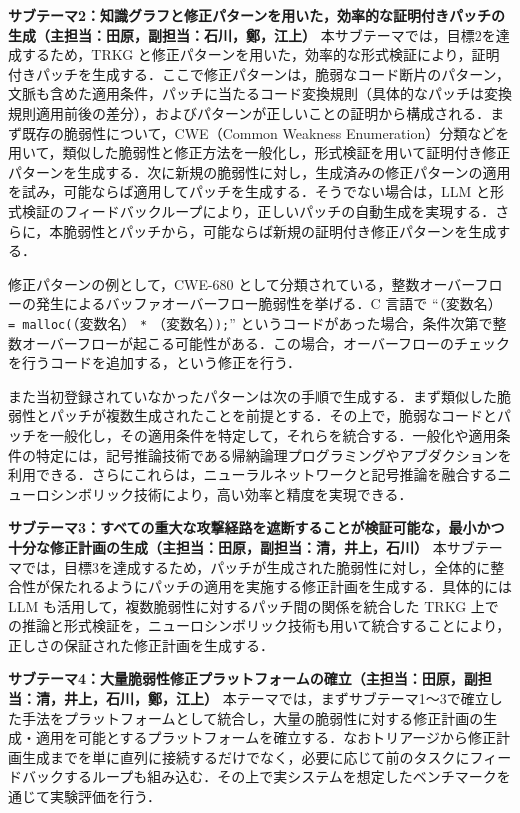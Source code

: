 \documentclass[11pt,a4j,dvipdfmx]{jarticle} 					%
\newcommand{\研究課題名}{大量の脆弱性・攻撃手段・パッチの依存関係を考慮した証明付き修正計画の自動生成}
\newcommand{\研究機関名}{電気通信大学}
\newcommand{\研究代表者氏名}{田原 康之}
\newcommand{\研究期間の最終元号年度}{12}  %
\begin{document}
\noindent\textbf{サブテーマ2：知識グラフと修正パターンを用いた，効率的な証明付きパッチの生成（主担当：田原，副担当：石川，鄭，江上）} 本サブテーマでは，目標2を達成するため，TRKG と修正パターンを用いた，効率的な形式検証により，証明付きパッチを生成する．ここで修正パターンは，脆弱なコード断片のパターン，文脈も含めた適用条件，パッチに当たるコード変換規則（具体的なパッチは変換規則適用前後の差分），およびパターンが正しいことの証明から構成される．まず既存の脆弱性について，CWE（Common Weakness Enumeration）分類などを用いて，類似した脆弱性と修正方法を一般化し，形式検証を用いて証明付き修正パターンを生成する．次に新規の脆弱性に対し，生成済みの修正パターンの適用を試み，可能ならば適用してパッチを生成する．そうでない場合は，LLM と形式検証のフィードバックループにより，正しいパッチの自動生成を実現する．さらに，本脆弱性とパッチから，可能ならば新規の証明付き修正パターンを生成する．

修正パターンの例として，CWE-680 として分類されている，整数オーバーフローの発生によるバッファオーバーフロー脆弱性を挙げる．C 言語で ``（変数名） \texttt{= malloc(}（変数名） \texttt{*} （変数名）\texttt{);}'' というコードがあった場合，条件次第で整数オーバーフローが起こる可能性がある．この場合，オーバーフローのチェックを行うコードを追加する，という修正を行う．

また当初登録されていなかったパターンは次の手順で生成する．まず類似した脆弱性とパッチが複数生成されたことを前提とする．その上で，脆弱なコードとパッチを一般化し，その適用条件を特定して，それらを統合する．一般化や適用条件の特定には，記号推論技術である帰納論理プログラミングやアブダクションを利用できる．さらにこれらは，ニューラルネットワークと記号推論を融合するニューロシンボリック技術により，高い効率と精度を実現できる．

\noindent\textbf{サブテーマ3：すべての重大な攻撃経路を遮断することが検証可能な，最小かつ十分な修正計画の生成（主担当：田原，副担当：清，井上，石川）} 本サブテーマでは，目標3を達成するため，パッチが生成された脆弱性に対し，全体的に整合性が保たれるようにパッチの適用を実施する修正計画を生成する．具体的には LLM も活用して，複数脆弱性に対するパッチ間の関係を統合した TRKG 上での推論と形式検証を，ニューロシンボリック技術も用いて統合することにより，正しさの保証された修正計画を生成する．

\noindent\textbf{サブテーマ4：大量脆弱性修正プラットフォームの確立（主担当：田原，副担当：清，井上，石川，鄭，江上）} 本テーマでは，まずサブテーマ1～3で確立した手法をプラットフォームとして統合し，大量の脆弱性に対する修正計画の生成・適用を可能とするプラットフォームを確立する．なおトリアージから修正計画生成までを単に直列に接続するだけでなく，必要に応じて前のタスクにフィードバックするループも組み込む．その上で実システムを想定したベンチマークを通じて実験評価を行う．
\end{document}
